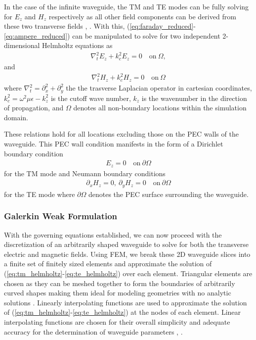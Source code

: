 In the case of the infinite waveguide, the TM and TE modes can be fully solving for $E_z$ and $H_z$ respectively as all other field components can be derived from these two transverse fields \cite{rothlecnotes}, \cite{jin2011theory}. With this, (\ref{eq:faraday_reduced}-\ref{eq:ampere_reduced}) can be manipulated to solve for two independent 2-dimensional Helmholtz equations as
\begin{align}
	\nabla_t^2 E_z+k_c^2E_z=0 \quad \mathrm{on} \ \Omega,
	\label{eq:tm_helmholtz}
\end{align}
and
\begin{align}
	\nabla_t^2 H_z+k_c^2H_z=0 \quad \mathrm{on} \ \Omega
	\label{eq:te_helmholtz}
\end{align}
where $\nabla_t^2=\partial^2_x+\partial^2_y$ the the trasverse Laplacian operator in cartesian coordinates, $k_c^2=\omega^2\mu\epsilon-k_z^2$ is the cutoff wave number, $k_z$ is the wavenumber in the direction of propagation, and $\Omega$ denotes all non-boundary locations within the simulation domain.

These relations hold for all locations excluding those on the PEC walls of the waveguide. This PEC wall condition manifests in the form of a Dirichlet boundary condition
\begin{align}
	E_z=0 \quad \mathrm{on} \ \partial\Omega
	\label{eq:diriclet_tm}
\end{align}
for the TM mode and Neumann boundary conditions
\begin{align}
	\partial_x H_z = 0,\ \partial_y H_z = 0 \quad \mathrm{on} \ \partial\Omega
	\label{eq:neumann_te}
\end{align}
for the TE mode where $\partial\Omega$ denotes the PEC surface surrounding the waveguide.

\subsubsection{Galerkin Weak Formulation}
\label{subsub:galerkin_weak}
With the governing equations established, we can now proceed with the discretization of an arbitrarily shaped waveguide to solve for both the transverse electric and magnetic fields. Using FEM, we break these 2D waveguide slices into a finite set of finitely sized elements and approximate the solution of (\ref{eq:tm_helmholtz}-\ref{eq:te_helmholtz}) over each element. Triangular elements are chosen as they can be meshed together to form the boundaries of arbitrarily curved shapes making them ideal for modeling geometries with no analytic solutions \cite{jin2011theory}. Linearly interpolating functions are used to approximate the solution of (\ref{eq:tm_helmholtz}-\ref{eq:te_helmholtz}) at the nodes of each element. Linear interpolating functions are chosen for their overall simplicity and adequate accuracy for the determination of waveguide parameters \cite{rothlecnotes}, \cite{jin2011theory}. 

